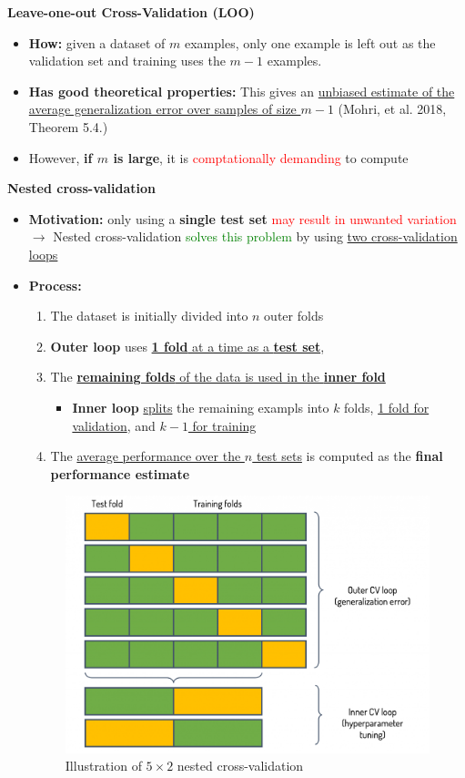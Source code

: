 \documentclass[12pt, a4paper]{article}
\begin{document}
\bigskip


\textbf{Leave-one-out Cross-Validation (LOO)}
\begin{itemize}
  \item \textbf{How:} given a dataset of $m$ examples, only one example is left out as the validation set and training uses the $m - 1$ examples.
  \item \textbf{Has good theoretical properties:} This gives an \uline{unbiased estimate of the average generalization error over samples of size $m - 1$} (Mohri, et al. 2018, Theorem 5.4.)
  \item However, \textbf{if $m$ is large}, it is \textcolor{red}{comptationally demanding} to compute
\end{itemize}


\bigskip


\textbf{Nested cross-validation}
\begin{itemize}
  \item \textbf{Motivation:} only using a \textbf{single test set} \textcolor{red}{may result in unwanted variation} $\rightarrow$ Nested cross-validation \textcolor{Green}{solves this problem} by using \uline{two cross-validation loops}
  \item \textbf{Process:}
  \begin{enumerate}
    \item The dataset is initially divided into $n$ outer folds
    \item \textbf{Outer loop} uses \uline{\textbf{1 fold} at a time as a \textbf{test set}},
    \item The \uline{\textbf{remaining folds} of the data is used in the \textbf{inner fold}}
    \begin{itemize}
      \item \textbf{Inner loop} \uline{splits} the remaining exampls into $k$ folds, \uline{1 fold for validation}, and \uline{$k - 1$ for training}
    \end{itemize}
    \item The \uline{average performance over the $n$ test sets} is computed as the \textbf{final performance estimate}
  \end{enumerate}
  \begin{figure}[H]
    \centering  %
      \includegraphics[width=0.8\columnwidth]{images/nested-cv.png}
      \caption{Illustration of $5 \times 2$ nested cross-validation}
      \label{fig:nested-cv}
  \end{figure}
\end{itemize}
\end{document}
